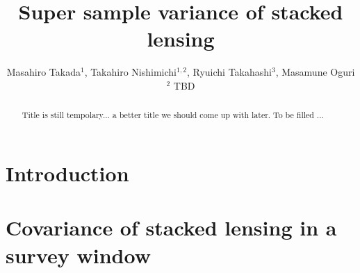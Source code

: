 \documentclass[onecolumn,notitlepage,showpacs,amsmath,amssymb,prd,floatfix]{revtex4-1}
\newcommand{\btheta}{{\bm{\theta}}}
\newcommand{\dr}{\mathrm{d}}
\begin{document}
\title{Super sample variance of stacked lensing}

\author{Masahiro Takada$^1$, Takahiro Nishimichi$^{1,2}$, Ryuichi
Takahashi$^{3}$, Masamune Oguri$^2$ TBD}
%

 \begin{abstract}
  Title is still tempolary... a better title we should come up with
  later. 
To be filled ... 
 \end{abstract}
\maketitle

\section{Introduction}

\cite{HuKravtsov:03}
\cite{TakadaBridle:07}
\cite{TakadaJain:09}
\cite{Kayoetal:13}
\cite{TakadaHu:13} \cite{Lietal:14a} \cite{Lietal:14b}
\cite{OguriTakada:11}
\cite{Hikageetal:13} \cite{Hikageetal:12}
\cite{TakadaSpergel:13} \cite{Schaanetal:14} \cite{Miyatakeetal:15a}
\cite{Miyatakeetal:15}
\cite{Satoetal:09} \cite{Okabeetal:10}
\cite{Lietal:15} \cite{Baldaufetal:15}
\cite{Mandelbaumetal:05}
\cite{Mandelbaumetal:13}
\cite{MoreMiyatakeEtAl15}


\section{Covariance of stacked lensing in a survey window}

%
\end{document}
